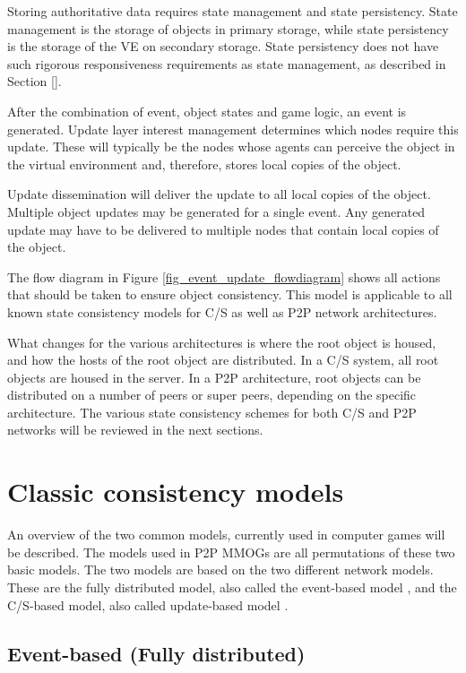 Storing authoritative data requires state management and state persistency. State management is the storage of objects in primary storage, while state persistency is the storage of the VE on secondary storage. State persistency does not have such rigorous responsiveness requirements as state management, as described in Section \ref{}.

After the combination of event, object states and game logic, an event is generated. Update layer interest management determines which nodes require this update. These will typically be the nodes whose agents can perceive the object in the virtual environment and, therefore, stores local copies of the object.

Update dissemination will deliver the update to all local copies of the object. Multiple object updates may be generated for a single event. Any generated update may have to be delivered to multiple nodes that contain local copies of the object.

The flow diagram in Figure \ref{fig_event_update_flowdiagram} shows all actions that should be taken to ensure object consistency. This model is applicable to all known state consistency models for C/S as well as P2P network architectures.

What changes for the various architectures is where the root object is housed, and how the hosts of the root object are distributed. In a C/S system, all root objects are housed in the server. In a P2P architecture, root objects can be distributed on a number of peers or super peers, depending on the specific architecture. The various state consistency schemes for both C/S and P2P networks will be reviewed in the next sections.

\section{Classic consistency models}
\label{classic_models}

An overview of the two common models, currently used in computer games will be described. The models used in P2P MMOGs are all permutations of these two basic models. The two models are based on the two different network models. These are the fully distributed model, also called the event-based model \cite{p2p_cm_aoe}, and the C/S-based model, also called update-based model
\cite{unreal_networking}.

\subsection{Event-based (Fully distributed)}
\label{classic_event_based}


